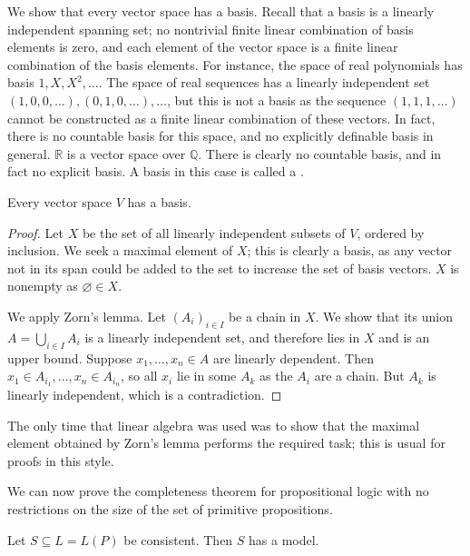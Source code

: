 We show that every vector space has a basis.
Recall that a basis is a linearly independent spanning set; no nontrivial finite linear combination of basis elements is zero, and each element of the vector space is a finite linear combination of the basis elements.
For instance, the space of real polynomials has basis $1, X, X^2, \dots$.
The space of real sequences has a linearly independent set $(1, 0, 0, \dots), (0, 1, 0, \dots), \dots$, but this is not a basis as the sequence $(1, 1, 1, \dots)$ cannot be constructed as a finite linear combination of these vectors.
In fact, there is no countable basis for this space, and no explicitly definable basis in general.
$\mathbb R$ is a vector space over $\mathbb Q$.
There is clearly no countable basis, and in fact no explicit basis.
A basis in this case is called a .
\begin{theorem}
    Every vector space $V$ has a basis.
\end{theorem}
\begin{proof}
    Let $X$ be the set of all linearly independent subsets of $V$, ordered by inclusion.
    We seek a maximal element of $X$; this is clearly a basis, as any vector not in its span could be added to the set to increase the set of basis vectors.
    $X$ is nonempty as $\varnothing \in X$.

    We apply Zorn's lemma.
    Let $(A_i)_{i \in I}$ be a chain in $X$.
    We show that its union $A = \bigcup_{i \in I} A_i$ is a linearly independent set, and therefore lies in $X$ and is an upper bound.
    Suppose $x_1, \dots, x_n \in A$ are linearly dependent.
    Then $x_1 \in A_{i_1}, \dots, x_n \in A_{i_n}$, so all $x_i$ lie in some $A_k$ as the $A_i$ are a chain.
    But $A_k$ is linearly independent, which is a contradiction.
\end{proof}
\begin{remark}
    The only time that linear algebra was used was to show that the maximal element obtained by Zorn's lemma performs the required task; this is usual for proofs in this style.
\end{remark}
We can now prove the completeness theorem for propositional logic with no restrictions on the size of the set of primitive propositions.
\begin{theorem}
    Let $S \subseteq L = L(P)$ be consistent.
    Then $S$ has a model.
\end{theorem}
